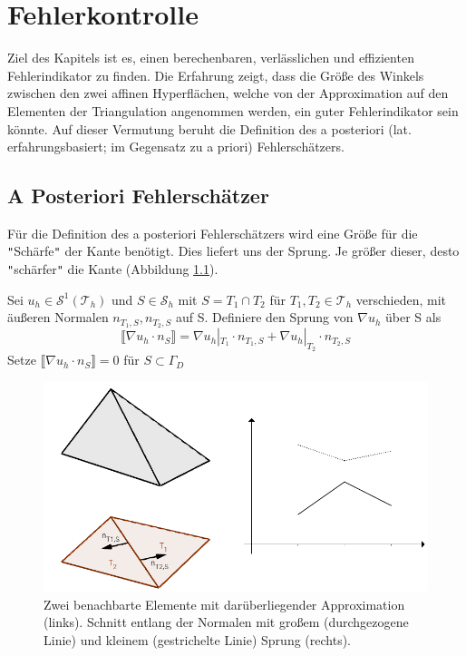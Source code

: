 \chapter{Fehlerkontrolle}
Ziel des Kapitels ist es, einen berechenbaren, verlässlichen und effizienten Fehlerindikator zu finden. Die Erfahrung zeigt, dass die Größe des Winkels zwischen den zwei affinen Hyperflächen, welche von der Approximation auf den Elementen der Triangulation angenommen werden, ein guter Fehlerindikator sein könnte. Auf dieser Vermutung beruht die Definition des a posteriori (lat. erfahrungsbasiert; im Gegensatz zu a priori) Fehlerschätzers. 

\section{A Posteriori Fehlerschätzer}
Für die Definition des a posteriori  Fehlerschätzers wird eine Größe für die \verb|"|Schärfe\verb|"| der Kante benötigt. Dies liefert uns der Sprung. Je größer dieser, desto \verb|"|schärfer\verb|"| die Kante (Abbildung \ref{sprung}). 
\begin{definition}[Sprung]
	Sei $u_h\in\mathscr{S}^1(\mathscr{T}_h)$ und $S\in\mathscr{S}_h$ mit $S=T_1 \cap T_2$ für $T_1,T_2 \in \mathscr{T}_h$ verschieden, mit äußeren Normalen $n_{T_1,S},n_{T_2,S}$ auf S. Definiere den Sprung von $\nabla u_h$ über S als
	\[
	\llbracket \nabla u_h \cdot n_S\rrbracket = \nabla u_h|_{T_1} \cdot n_{T_1,S} + \nabla u_h|_{T_2} \cdot n_{T_2,S}
	\]
	Setze $\llbracket \nabla u_h \cdot n_S\rrbracket = 0$ für $S\subset \Gamma_D$
\end{definition} 

\begin{figure}[!htbp]
	\begin{center}
		\includegraphics[width=12cm]{pics/Sprung.png}
	\end{center}
	\caption{\label{sprung}Zwei benachbarte Elemente mit darüberliegender Approximation (links). Schnitt entlang der Normalen mit großem (durchgezogene Linie) und kleinem (gestrichelte Linie) Sprung (rechts).}
\end{figure}

